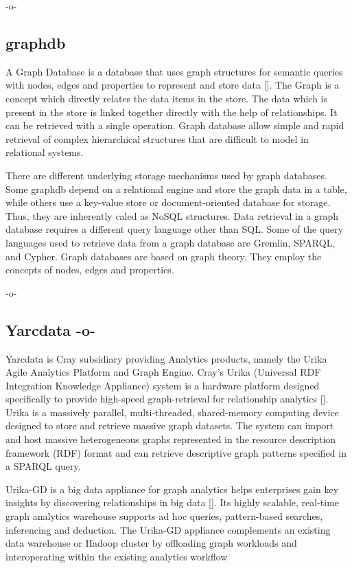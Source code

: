      -o-

     
\subsection{graphdb}

A Graph Database is a database that uses graph structures for semantic
queries with nodes, edges and properties to represent and store data
 [\cite{www-graphdb}]. The Graph is a concept which directly relates the
data items in the store.  The data which is present in the store is
linked together directly with the help of relationships. It can be
retrieved with a single operation.  Graph database allow simple and
rapid retrieval of complex hierarchical structures that are difficult
to model in relational systems.

There are different underlying storage mechanisms used by graph
databases.  Some graphdb depend on a relational engine and store the
graph data in a table, while others use a key-value store or
document-oriented database for storage. Thus, they are inherently
caled as NoSQL structures.  Data retrieval in a graph database
requires a different query language other than SQL. Some of the query
languages used to retrieve data from a graph database are Gremlin,
SPARQL, and Cypher.  Graph databases are based on graph theory. They
employ the concepts of nodes, edges and properties.

     -o-
     
\subsection{Yarcdata -o-}

Yarcdata is Cray subsidiary providing Analytics products, namely the
Urika Agile Analytics Platform and Graph Engine. Cray's Urika
(Universal RDF Integration Knowledge Appliance) system is a hardware
platform designed specifically to provide high-speed graph-retrieval
for relationship analytics [\cite{www-Urika-appliance}].  Urika is a
massively parallel, multi-threaded, shared-memory computing device
designed to store and retrieve massive graph datasets. The system can
import and host massive heterogeneous graphs represented in the
resource description framework (RDF) format and can retrieve
descriptive graph patterns specified in a SPARQL query.

Urika-GD is a big data appliance for graph analytics helps enterprises
gain key insights by discovering relationships in big
data [\cite{techspec-Urika-GD}].  Its highly scalable, real-time graph
analytics warehouse supports ad hoc queries, pattern-based searches,
inferencing and deduction. The Urika-GD appliance complements an
existing data warehouse or Hadoop cluster by offloading graph
workloads and interoperating within the existing analytics workflow

